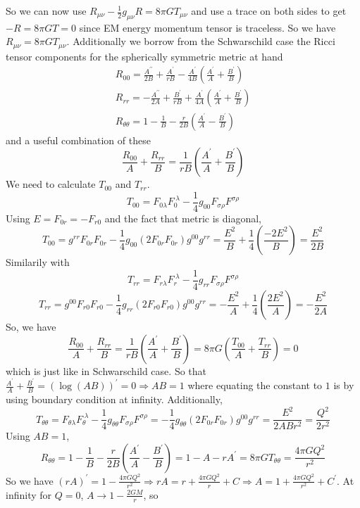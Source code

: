 ﻿\documentclass[12pt,a4paper]{article}
\begin{document}
So we can now use $R_{\mu \nu}-\frac{1}{2}g_{\mu \nu}R=8 \pi G T_{\mu \nu}$ and use a trace on both sides to get $-R=8 \pi GT=0$ since EM energy momentum tensor is traceless. So we have $R_{\mu \nu}=8 \pi G T_{\mu \nu}$. Additionally we borrow from the Schwarschild case the Ricci tensor components for the spherically symmetric metric at hand
$$
\begin{array}{l}
R_{0 0}=\frac{A^{\prime \prime}}{2 B}+\frac{A^{\prime}}{r B}-\frac{A^{\prime}}{4 B}\left(\frac{A^{\prime}}{A}+\frac{B^{\prime}}{B}\right) \\
R_{r r}=-\frac{A^{\prime \prime}}{2 A}+\frac{B^{\prime}}{r B}+\frac{A^{\prime}}{4 A}\left(\frac{A^{\prime}}{A}+\frac{B^{\prime}}{B}\right) \\
R_{\theta \theta}=1-\frac{1}{B}-\frac{r}{2 B}\left(\frac{A^{\prime}}{A}-\frac{B^{\prime}}{B}\right)
\end{array}
$$
and a useful combination of these
$$
\frac{R_{00}}{A}+\frac{R_{r r}}{B}=\frac{1}{r B}\left(\frac{A^{\prime}}{A}+\frac{B^{\prime}}{B}\right)
$$
We need to calculate $T_{00}$ and $T_{r r}$.
$$T_{00}=F_{0 \lambda} F_{0}^{\;\lambda}-\frac{1}{4} g_{00} F_{\sigma \rho} F^{\sigma \rho}$$
Using $E=F_{0 r}=-F_{r 0}$ and the fact that metric is diagonal, 
$$T_{00}=g^{r r} F_{0 r} F_{0 r}-\frac{1}{4} g_{00}\left(2 F_{0 r} F_{0 r}\right) g^{00} g^{r r}=\frac{E^{2}}{B}+\frac{1}{4}\left(\frac{-2 E^{2}}{B}\right)=\frac{E^{2}}{2 B}$$
Similarily with 
$$T_{r r}=F_{r \lambda} F_{r}^{\;\lambda}-\frac{1}{4} g_{r r} F_{\sigma \rho} F^{\sigma \rho}$$
$$T_{r r}=g^{0 0} F_{r 0} F_{r 0}-\frac{1}{4} g_{r r}\left(2 F_{r 0} F_{r 0}\right) g^{00} g^{r r}=-\frac{E^{2}}{A}+\frac{1}{4}\left(\frac{2 E^{2}}{A}\right)=-\frac{E^{2}}{2 A}$$
So, we have 
$$
\frac{R_{00}}{A}+\frac{R_{r r}}{B}=\frac{1}{r B}\left(\frac{A^{\prime}}{A}+\frac{B^{\prime}}{B}\right)=8\pi G \left(\frac{T_{00}}{A}+\frac{T_{r r}}{B}\right)=0
$$
which is just like in Schwarschild case. So that $\frac{A^{\prime}}{A}+\frac{B^{\prime}}{B}=(\log(AB))^{\prime}=0 \Rightarrow AB=1$ where equating the constant to $1$ is by using boundary condition at infinity. Additionally,
$$T_{\theta \theta}=F_{\theta \lambda} F_{\theta}^{\;\lambda}-\frac{1}{4} g_{\theta \theta} F_{\sigma \rho} F^{\sigma \rho}=-\frac{1}{4} g_{\theta \theta}\left(2 F_{0 r} F_{0 r}\right) g^{00} g^{r r}=\frac{E^{2}}{2 A B r^{2}}=\frac{Q^{2}}{2 r^{2}}$$
Using $A B=1$, 
$$
R_{\theta \theta}=1-\frac{1}{B}-\frac{r}{2 B}\left(\frac{A^{\prime}}{A}-\frac{B^{\prime}}{B}\right)=1-A-r A^{\prime}=8 \pi G T_{\theta \theta}=\frac{4 \pi G Q^{2}}{r^{2}}
$$
So we have $(r A)^{\prime}=1-\frac{4 \pi G Q^{2}}{r^{2}}\Rightarrow rA=r+\frac{4 \pi G Q^{2}}{r}+C \Rightarrow A=1+\frac{4 \pi G Q^{2}}{r^{2}}+C^{\prime}$. At infinity for $Q=0$, $A\rightarrow 1-\frac{2GM}{r}$, so
\end{document}

